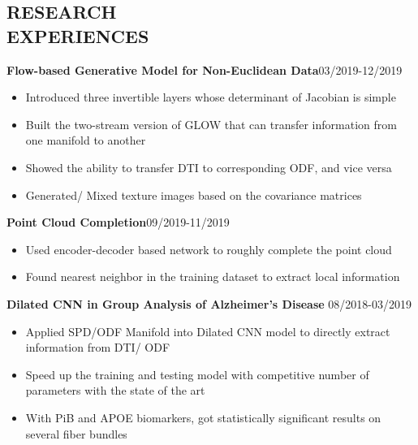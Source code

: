 \documentclass[margin]{res}
\begin{document}
\begin{resume}
\section{RESEARCH \\ EXPERIENCES}
                \textbf{Flow-based Generative Model for Non-Euclidean Data}\hfill 03/2019-12/2019
                \begin{itemize}\itemsep -2.2pt %
                 \item Introduced three invertible layers whose determinant of Jacobian is simple
                 \item Built the two-stream version of GLOW that can transfer information from one manifold to another
                 \item Showed the ability to transfer DTI to corresponding ODF, and vice versa
                 \item Generated/ Mixed texture images based on the covariance matrices
                 \end{itemize}

                \textbf{Point Cloud Completion}\hfill 09/2019-11/2019
                \begin{itemize}\itemsep -2.2pt %
                 \item Used encoder-decoder based network to roughly complete the point cloud
                 \item Found nearest neighbor in the training dataset to extract local information
                 \end{itemize}

                \textbf{Dilated CNN in Group Analysis of Alzheimer's Disease} \hfill 08/2018-03/2019
                \begin{itemize}\itemsep -2.2pt %
                 \item Applied SPD/ODF Manifold into Dilated CNN model to directly extract information from DTI/ ODF
                 \item Speed up the training and testing model with competitive number of parameters with the state of the art 
                 \item With PiB and APOE biomarkers, got statistically signiﬁcant results on several fiber bundles
                 \end{itemize}


\end{resume}
\end{document}
